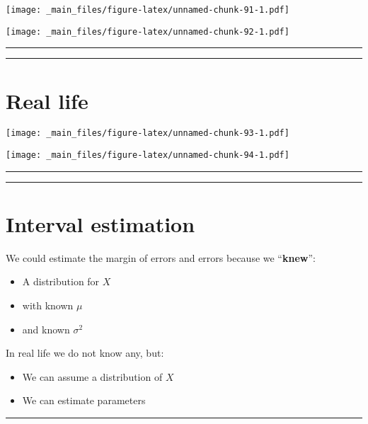 \documentclass[
]{book}
\providecommand{\tightlist}{%
  \setlength{\itemsep}{0pt}\setlength{\parskip}{0pt}}
\begin{document}
\texttt{[image: \_main\_files/figure-latex/unnamed-chunk-91-1.pdf]}

\texttt{[image: \_main\_files/figure-latex/unnamed-chunk-92-1.pdf]}

\begin{center}\rule{0.5\linewidth}{0.5pt}\end{center}

\begin{center}\rule{0.5\linewidth}{0.5pt}\end{center}

\hypertarget{real-life}{%
\section{Real life}\label{real-life}}

\texttt{[image: \_main\_files/figure-latex/unnamed-chunk-93-1.pdf]}

\texttt{[image: \_main\_files/figure-latex/unnamed-chunk-94-1.pdf]}

\begin{center}\rule{0.5\linewidth}{0.5pt}\end{center}

\begin{center}\rule{0.5\linewidth}{0.5pt}\end{center}

\hypertarget{interval-estimation-1}{%
\section{Interval estimation}\label{interval-estimation-1}}

We could estimate the margin of errors and errors because we ``\textbf{knew}'':

\begin{itemize}
\tightlist
\item
  A distribution for \(X\)
\item
  with known \(\mu\)
\item
  and known \(\sigma^2\)
\end{itemize}

In real life we do not know any, but:

\begin{itemize}
\tightlist
\item
  We can assume a distribution of \(X\)
\item
  We can estimate parameters
\end{itemize}

\begin{center}\rule{0.5\linewidth}{0.5pt}\end{center}
\end{document}
